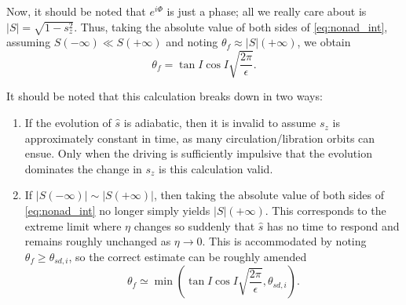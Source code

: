 \documentclass[
        fleqn,
        usenatbib,
        referee,
    ]{mnras}
\newcommand*{\abs}[1]{\left|#1\right|}
\newcommand*{\p}[1]{\left(#1\right)}
\begin{document}
Now, it should be noted that $e^{i\Phi}$ is just a phase; all we really care
about is $\abs{S} = \sqrt{1 - s_z^2}$. Thus, taking the absolute value of both
sides of \autoref{eq:nonad_int}, assuming $S\p{-\infty} \ll S\p{+\infty}$ and
noting $\theta_f \approx \abs{S}(+\infty)$, we obtain
\begin{equation}
    \theta_f = \tan I\cos I\sqrt{\frac{2\pi}{\epsilon}}.\label{eq:nonad_dong}
\end{equation}

It should be noted that this calculation breaks down in two ways:
\begin{enumerate}
    \item If the evolution of $\hat{s}$ is adiabatic, then it is invalid to
        assume $s_z$ is approximately constant in time, as many
        circulation/libration orbits can ensue. Only when the driving is
        sufficiently impulsive that the evolution dominates the change in $s_z$
        is this calculation valid.

    \item If $\abs{S\p{-\infty}} \sim \abs{S\p{+\infty}}$, then taking the
        absolute value of both sides of \autoref{eq:nonad_int} no longer simply
        yields $\abs{S}\p{+\infty}$. This corresponds to the extreme limit
        where $\eta$ changes so suddenly that $\hat{s}$ has no time to respond
        and remains roughly unchanged as $\eta \to 0$. This is accommodated by
        noting $\theta_f \geq \theta_{sd, i}$, so the correct estimate can be
        roughly amended
        \begin{equation}
            \theta_f \simeq \min\p{\tan I\cos I\sqrt{\frac{2\pi}{\epsilon}},
                \theta_{sd, i}}.
        \end{equation}
\end{enumerate}

\bsp
\label{lastpage} %
\end{document}
